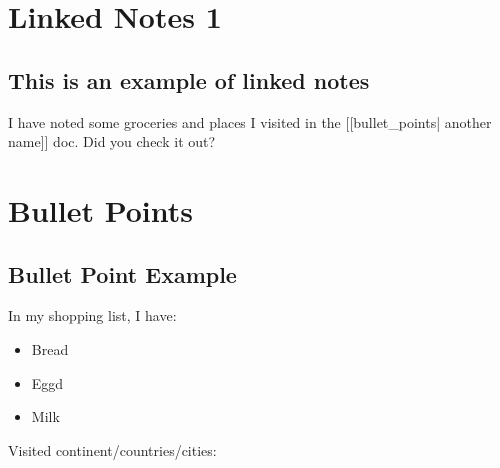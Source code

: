 \documentclass[10pt]{report}
\begin{document}
\tableofcontents


\chapter{Linked Notes 1}

\section{This is an example of linked notes}


I have noted some groceries and places I visited in the [[bullet\_points| another name]] doc. Did you check it out?
\chapter{Bullet Points}

\section{Bullet Point Example}


In my shopping list, I have:

\begin{itemize}
\item Bread
\item Eggd

\item Milk

\end{itemize}


Visited continent/countries/cities:
\end{document}
